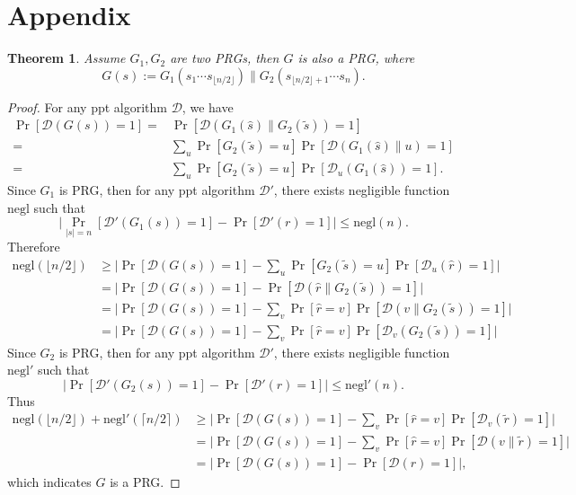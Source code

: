 \documentclass[a4paper]{article}
\newtheorem{theorem}{Theorem}
\newtheorem*{proof}{Proof}
\newcommand{\sbra}[1]{\left[ #1 \right]}
\newcommand{\negl}{\mathrm{negl}}
\newcommand{\ppt}{{\sc ppt} }
\begin{document}
\section*{Appendix}
\begin{theorem}\label{ap1}
    Assume $G_1,G_2$ are two PRGs, then $G$ is also a PRG, where
    $$
        G(s):=G_1(s_1\cdots s_{\lfloor n/2\rfloor})\|G_2(s_{\lfloor n/2\rfloor+1}\cdots s_n).
    $$
\end{theorem}
\begin{proof}
    For any \ppt algorithm $\mathcal D$, we have
    \begin{align*}
        \Pr\sbra{\mathcal D(G(s))=1}
        =&\Pr\sbra{\mathcal D(G_1(\hat s)\|G_2(\tilde s))=1}\\
        =&\sum_{u}\Pr\sbra{G_2(\tilde s)=u}
        \Pr\sbra{\mathcal D(G_1(\hat s)\|u)=1}\\
        =&\sum_{u}\Pr\sbra{G_2(\tilde s)=u}
        \Pr\sbra{\mathcal D_u(G_1(\hat s))=1}.
    \end{align*}
    Since $G_1$ is PRG, then for any \ppt algorithm $\mathcal D'$, there exists negligible function $\negl$ such that
    $$
    \Big|\Pr_{|s|=n}\sbra{\mathcal D'(G_1(s))=1}-\Pr\sbra{\mathcal D'(r)=1}\Big|\leq\negl(n).
    $$
    Therefore
    \begin{align*}
        \negl(\lfloor n/2\rfloor)&\geq
        \Big|\Pr\sbra{\mathcal D(G(s))=1}-\sum_{u}\Pr\sbra{G_2(\tilde s)=u}\Pr\sbra{\mathcal D_u(\hat r)=1}\Big|\\
        &=
        \Big|\Pr\sbra{\mathcal D(G(s))=1}-\Pr\sbra{\mathcal D(\hat r\|G_2(\tilde s))=1}\Big|\\
        &=
        \Big|\Pr\sbra{\mathcal D(G(s))=1}-\sum_{v}\Pr\sbra{\hat r=v}\Pr\sbra{\mathcal D(v\|G_2(\tilde s))=1}\Big|\\
        &=
        \Big|\Pr\sbra{\mathcal D(G(s))=1}-\sum_{v}\Pr\sbra{\hat r=v}\Pr\sbra{\mathcal D_v(G_2(\tilde s))=1}\Big|
    \end{align*}
    Since $G_2$ is PRG, then for any \ppt algorithm $\mathcal D'$, there exists negligible function $\negl'$ such that
    $$
    \Big|\Pr\sbra{\mathcal D'(G_2(s))=1}-\Pr\sbra{\mathcal D'(r)=1}\Big|\leq\negl'(n).
    $$
    Thus
    \begin{align*}
        \negl(\lfloor n/2\rfloor)+\negl'(\lceil n/2\rceil)&\geq
            \Big|\Pr\sbra{\mathcal D(G(s))=1}-\sum_{v}\Pr\sbra{\hat r=v}\Pr\sbra{\mathcal D_v(\tilde r)=1}\Big|\\
        &=
            \Big|\Pr\sbra{\mathcal D(G(s))=1}-\sum_{v}\Pr\sbra{\hat r=v}\Pr\sbra{\mathcal D(v\|\tilde r)=1}\Big|\\
        &=
            \Big|\Pr\sbra{\mathcal D(G(s))=1}-\Pr\sbra{\mathcal D(r)=1}\Big|,
    \end{align*}
    which indicates $G$ is a PRG. 
\end{proof}
\end{document}

